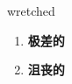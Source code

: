 
\begin{frame}
{\huge wretched}
\begin{center}
\begin{enumerate}\Large
  \item \textbf{极差的}
  \item \textbf{沮丧的}
\end{enumerate}
\end{center}
\end{frame}
